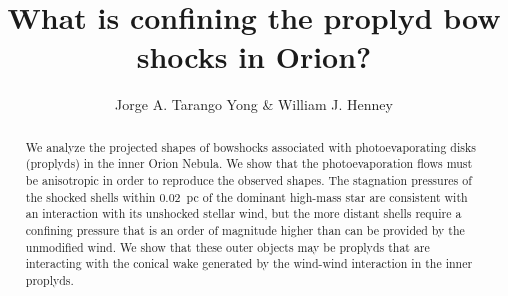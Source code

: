\documentclass[useAMS, usenatbib]{mnras}
\title[Proplyd bowshocks]{What is confining the proplyd bow shocks in Orion?}
\author[Tarango Yong \& Henney]{
  Jorge A. Tarango Yong \& William J. Henney\\
  \AddressCRyA
}
\begin{document}
\maketitle
\begin{abstract}
  We analyze the projected shapes of bowshocks associated with
  photoevaporating disks (proplyds) in the inner Orion Nebula.  We
  show that the photoevaporation flows must be anisotropic in order to
  reproduce the observed shapes.  The stagnation pressures of the
  shocked shells within 0.02~pc of the dominant high-mass star are
  consistent with an interaction with its unshocked stellar wind, but
  the more distant shells require a confining pressure that is an
  order of magnitude higher than can be provided by the unmodified
  wind.  We show that these outer objects may be proplyds that are
  interacting with the conical wake generated by the wind-wind
  interaction in the inner proplyds. 
\end{abstract}

\newcommand\thC{\(\theta^1\)\,Ori~C}
\newcommand\CRW{\citetalias{Canto:1996}}








\end{document}
